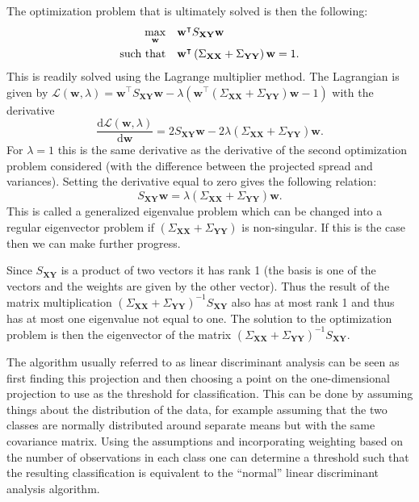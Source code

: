 \documentclass[a4paper, 12pt]{scrartcl}
\newcommand{\bfw}{\mathbf{w}}
\newcommand{\bfX}{\mathbf{X}}
\newcommand{\bfY}{\mathbf{Y}}
\begin{document}
The optimization problem that is ultimately solved is then the following:
\begin{equation}\label{opt:p}
\begin{aligned}
	\operatornamewithlimits{\mathrm{max}}_{\bfw}& & &\bfw^\intercal S_{\bfX\bfY}\bfw\\
	\text{such that}& & &\bfw^\intercal\left(\Sigma_{\bfX \bfX}+\Sigma_{\bfY \bfY}\right)\bfw=1.
\end{aligned}
\end{equation}
This is readily solved using the Lagrange multiplier method. The Lagrangian is given by $\mathcal{L}(\bfw, \lambda)=\bfw^\intercal S_{\bfX\bfY}\bfw - \lambda\left( \bfw^\intercal\left(\Sigma_{\bfX \bfX}+\Sigma_{\bfY \bfY}\right)\bfw - 1\right)$ with the derivative
\begin{equation*}
\frac{\mathrm{d}\mathcal{L}\left(\bfw, \lambda\right)}{\mathrm{d}\bfw}=2S_{\bfX \bfY}\bfw - 2\lambda \left(\Sigma_{\bfX \bfX}+\Sigma_{\bfY \bfY}\right)\bfw.
\end{equation*}
For $\lambda=1$ this is the same derivative as the derivative of the second optimization problem considered (with the difference between the projected spread and variances). Setting the derivative equal to zero gives the following relation:
\begin{equation*}
	S_{\bfX \bfY}\bfw = \lambda \left(\Sigma_{\bfX \bfX}+\Sigma_{\bfY \bfY}\right)\bfw.
\end{equation*}
This is called a generalized eigenvalue problem which can be changed into a regular eigenvector problem if $\left(\Sigma_{\bfX \bfX}+\Sigma_{\bfY \bfY}\right)$ is non-singular. If this is the case then we can make further progress.

Since $S_{\bfX \bfY}$ is a product of two vectors it has rank 1 (the basis is one of the vectors and the weights are given by the other vector). Thus the result of the matrix multiplication $\left(\Sigma_{\bfX \bfX}+\Sigma_{\bfY \bfY}\right)^{-1}S_{\bfX \bfY}$ also has at most rank 1 and thus has at most one eigenvalue not equal to one. The solution to the optimization problem is then the eigenvector of the matrix $\left(\Sigma_{\bfX \bfX}+\Sigma_{\bfY \bfY}\right)^{-1}S_{\bfX \bfY}$.

The algorithm usually referred to as linear discriminant analysis can be seen as first finding this projection and then choosing a point on the one-dimensional projection to use as the threshold for classification. This can be done by assuming things about the distribution of the data, for example assuming that the two classes are normally distributed around separate means but with the same covariance matrix. Using the assumptions and incorporating weighting based on the number of observations in each class one can determine a threshold such that the resulting classification is equivalent to the ``normal'' linear discriminant analysis algorithm.
\end{document}
